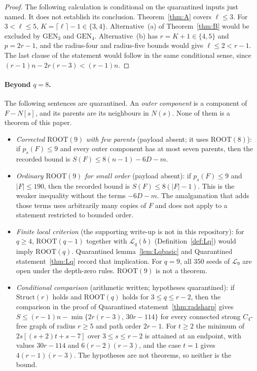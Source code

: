 \documentclass[11pt]{amsart}
\theoremstyle{definition}
\theoremstyle{remark}
\newcommand{\lr}{\ell}
\newcommand{\pp}{p}
\newcommand{\GEN}{\mathrm{GEN}}
\newcommand{\ROOT}{\mathrm{ROOT}}
\begin{document}
\begin{proof}
The following calculation is conditional on the quarantined inputs just named. It does not establish its conclusion. Theorem~\ref{thm:A} covers $\lr\le3$. For $3<\lr\le5$, $K=\lceil\lr\rceil-1\in\{3,4\}$. Alternative~(a) of Theorem~\ref{thm:B} would be excluded by $\GEN_3$ and $\GEN_4$. Alternative~(b) has $r=K+1\in\{4,5\}$ and $\pp=2r-1$, and the radius-four and radius-five bounds would give $\lr\le2<r-1$. The last clause of the statement would follow in the same conditional sense, since $(r-1)n-2r(r-3)<(r-1)n$.
\end{proof}

\paragraph{Beyond $q=8$.} The following sentences are quarantined. An \emph{outer component} is a component of $F-N[s]$, and its parents are its neighbours in $N(s)$. None of them is a theorem of this paper.
\begin{itemize}
\item \emph{Corrected $\ROOT(9)$ with few parents} (payload absent; it uses $\ROOT(8)$): if $\pp_s(F)\le9$ and every outer component has at most seven parents, then the recorded bound is $S(F)\le8(n-1)-6D-m$.
\item \emph{Ordinary $\ROOT(9)$ for small order} (payload absent): if $\pp_s(F)\le9$ and $|F|\le190$, then the recorded bound is $S(F)\le8(|F|-1)$. This is the weaker inequality without the terms $-6D-m$. The amalgamation that adds those terms uses arbitrarily many copies of $F$ and does not apply to a statement restricted to bounded order.
\item \emph{Finite local criterion} (the supporting write-up is not in this repository): for $q\ge4$, $\ROOT(q-1)$ together with $\mathcal L_q(b)$ (Definition~\ref{def:Lq}) would imply $\ROOT(q)$. Quarantined lemma~\ref{lem:Lqbasic} and Quarantined statement~\ref{thm:Lq} record that implication. For $q=9$, all $350$ seeds of $\mathcal L_9$ are open under the depth-zero rules. $\ROOT(9)$ is not a theorem.
\item \emph{Conditional comparison} (arithmetic written; hypotheses quarantined): if $\mathrm{Struct}(r)$ holds and $\ROOT(q)$ holds for $3\le q\le r-2$, then the comparison in the proof of Quarantined statement~\ref{thm:radsharp} gives $S\le(r-1)n-\min\{2r(r-3),\,30r-114\}$ for every connected strong $C_4$-free graph of radius $r\ge5$ and path order $2r-1$. For $t\ge2$ the minimum of $2s[(s+2)t+s-7]$ over $3\le s\le r-2$ is attained at an endpoint, with values $30r-114$ and $6(r-2)(r-3)$, and the case $t=1$ gives $4(r-1)(r-3)$. The hypotheses are not theorems, so neither is the bound.
\end{itemize}
\end{document}
